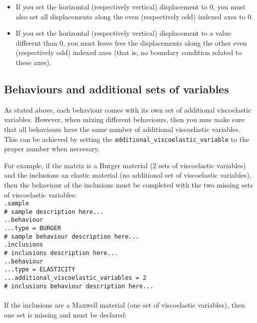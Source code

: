 \documentclass[10pt]{article}
\begin{document}
\begin{itemize}
	\item If you set the horizontal (respectively vertical) displacement to 0, you must also set all displacements along the even (respectively odd) indexed axes to 0.
	\item If you set the horizontal (respectively vertical) displacement to a value different than 0, you must leave free the displacements along the other even (respectively odd) indexed axes (that is, no boundary condition related to these axes).
\end{itemize}

\subsection{Behaviours and additional sets of variables}

As stated above, each behaviour comes with its own set of additional viscoelastic variables. However, when mixing different behaviours, then you mus make sure that all behaviours have the same number of additional viscoelastic variables. This can be achieved by setting the \verb+additional_viscoelastic_variable+ to the proper number when necessary.

For example, if the matrix is a Burger material (2 sets of viscoelastic variables) and the inclusions an elastic material (no additional set of viscoelastic variables), then the behaviour of the inclusions must be completed with the two missing sets of viscoelastic variables:\\

\noindent \verb+.sample+\\
\verb+# sample description here...+\\
\verb+..behaviour+\\
\verb+...type = BURGER+\\
\verb+# sample behaviour description here...+\\
\verb+.inclusions+\\
\verb+# inclusions description here...+\\
\verb+..behaviour+\\
\verb+...type = ELASTICITY+\\
\verb+...additional_viscoelastic_variables = 2+\\
\verb+# inclusions behaviour description here...+

\paragraph{} If the inclusions are a Maxwell material (one set of viscoelastic variables), then one set is missing and must be declared:\\
\end{document}
